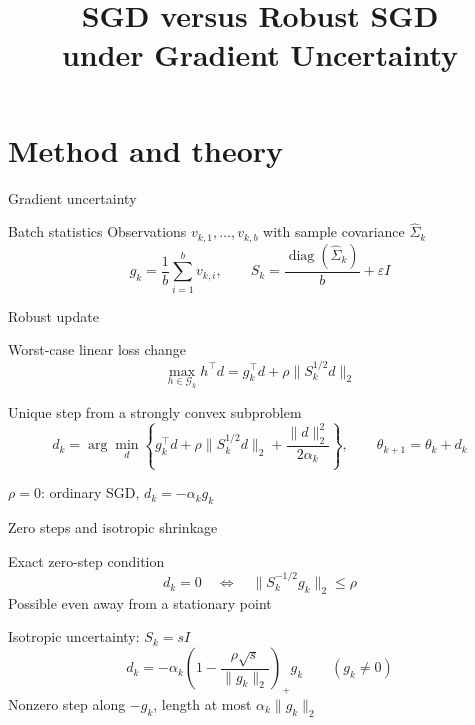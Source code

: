 \documentclass[aspectratio=169,xcolor=table]{beamer}
\title[SGD vs.\ R-SGD]{SGD versus Robust SGD\\under Gradient Uncertainty}
\date{}
\begin{document}
\begin{frame}
    \titlepage
\end{frame}

\section{Method and theory}

\begin{frame}{Gradient uncertainty}
    \begin{block}{Batch statistics}
        Observations \(v_{k,1},\ldots,v_{k,b}\) with sample covariance \(\widehat\Sigma_k\)
        \[
            g_k=\frac1b\sum_{i=1}^b v_{k,i},
            \qquad
            S_k=\frac{\operatorname{diag}(\widehat\Sigma_k)}{b}+\varepsilon I
        \]
    \end{block}
\end{frame}

\begin{frame}{Robust update}
    \begin{block}{Worst-case linear loss change}
        \[
            \max_{h\in\mathcal G_k} h^\top d
            =g_k^\top d+\rho\|S_k^{1/2}d\|_2
        \]
    \end{block}
    \begin{block}{Unique step from a strongly convex subproblem}
        \[
            d_k=\arg\min_d
            \left\{g_k^\top d+\rho\|S_k^{1/2}d\|_2
                 +\frac{\|d\|_2^2}{2\alpha_k}\right\},
            \qquad \theta_{k+1}=\theta_k+d_k
        \]
    \end{block}
    \begin{center}
        \(\rho=0\): ordinary SGD, \(d_k=-\alpha_k g_k\)
    \end{center}
\end{frame}

\begin{frame}{Zero steps and isotropic shrinkage}
    \begin{alertblock}{Exact zero-step condition}
        \[
            d_k=0 \quad\Longleftrightarrow\quad
            \|S_k^{-1/2}g_k\|_2\le\rho
        \]
        Possible even away from a stationary point
    \end{alertblock}
    \begin{block}{Isotropic uncertainty: \(S_k=sI\)}
        \[
            d_k=-\alpha_k
            \left(1-\frac{\rho\sqrt{s}}{\|g_k\|_2}\right)_+g_k
            \qquad (g_k\ne 0)
        \]
        Nonzero step along \(-g_k\), length at most \(\alpha_k\|g_k\|_2\)
    \end{block}
\end{frame}
\end{document}
